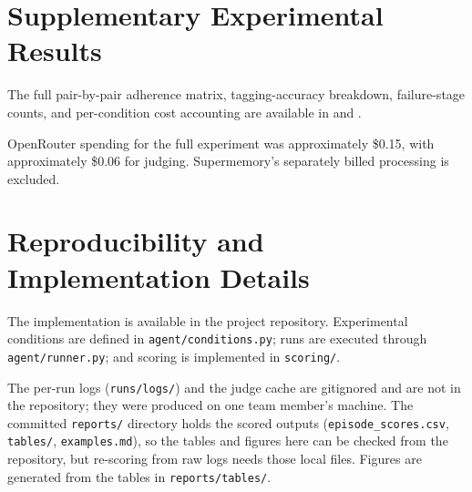 \documentclass[11pt,a4paper]{article}
\begin{document}
\section{Supplementary Experimental Results}
\label{app:supplementary-results}

The full pair-by-pair adherence matrix,
tagging-accuracy breakdown, failure-stage
counts, and per-condition cost accounting
are available in 
and .

OpenRouter spending for the full experiment
was approximately \$0.15, with approximately
\$0.06 for judging. Supermemory's separately
billed processing is excluded.

\section{Reproducibility and Implementation Details}
\label{app:reproducibility}

The implementation is available in the project
repository. Experimental conditions are defined
in \texttt{agent/conditions.py}; runs are executed
through \texttt{agent/runner.py}; and scoring is
implemented in \texttt{scoring/}.

The per-run logs (\texttt{runs/logs/}) and the judge cache
are gitignored and are not in the repository; they were
produced on one team member's machine. The committed
\texttt{reports/} directory holds the scored outputs
(\texttt{episode\_scores.csv}, \texttt{tables/},
\texttt{examples.md}), so the tables and figures here can
be checked from the repository, but re-scoring from raw
logs needs those local files. Figures are generated from the
tables in \texttt{reports/tables/}.
\end{document}
